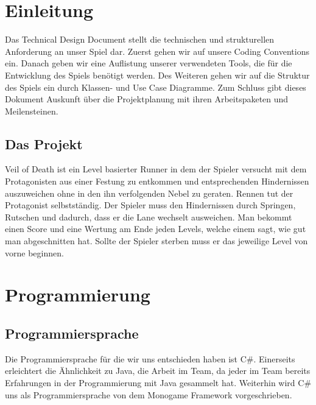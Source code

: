 \documentclass{article}
\begin{document}



\newpage

\tableofcontents

\newpage
	
\section{Einleitung}


Das Technical Design Document stellt die technischen und strukturellen Anforderung an unser
Spiel dar. Zuerst gehen wir auf unsere Coding Conventions ein. Danach geben wir eine Auflistung
unserer verwendeten Tools, die für die Entwicklung des Spiels benötigt werden. Des Weiteren
gehen wir auf die Struktur des Spiels ein durch Klassen- und Use Case Diagramme. Zum Schluss
gibt dieses Dokument Auskunft über die Projektplanung mit ihren Arbeitspaketen und
Meilensteinen.

\vspace{2cm}

\subsection{Das Projekt}


Veil of Death ist ein Level basierter Runner in dem der Spieler versucht mit dem Protagonisten aus einer Festung zu entkommen und entsprechenden Hindernissen auszuweichen ohne in den ihn verfolgenden Nebel zu geraten. Rennen tut der Protagonist selbstständig. Der Spieler muss den Hindernissen durch Springen, Rutschen und dadurch, dass er die Lane wechselt ausweichen.
Man bekommt einen Score und eine Wertung am Ende jeden Levels, welche einem sagt, wie gut
man abgeschnitten hat. Sollte der Spieler sterben muss er das jeweilige Level von vorne beginnen.

\newpage

\section{Programmierung}

\vspace{1cm}

\subsection{Programmiersprache}

Die Programmiersprache für die wir uns entschieden haben ist C\#. Einerseits erleichtert die Ähnlichkeit zu Java, die Arbeit im Team, da
jeder im Team bereits Erfahrungen in der Programmierung mit Java gesammelt hat. Weiterhin wird C\# uns als Programmiersprache von
dem Monogame Framework vorgeschrieben.
\end{document}
